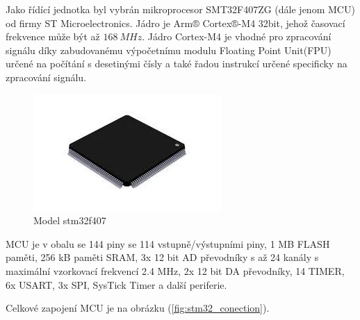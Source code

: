 Jako řídící jednotka byl vybrán mikroprocesor SMT32F407ZG (dále jenom MCU) od firmy ST Microelectronics.
Jádro je Arm® Cortex®-M4 32bit, jehož časovací frekvence může být až $168 \ MHz$. Jádro Cortex-M4 je vhodné pro zpracování signálu díky zabudovanému výpočetnímu modulu Floating Point Unit(FPU) určené na
počítání s desetinými čísly a také řadou instrukcí určené specificky na zpracování signálu.
\begin{figure}[H]
    \centering
    \includegraphics[width=0.5\linewidth]{pictures/stm32f407.jpg}
    \caption{Model stm32f407}
    \label{fig:stm32}
\end{figure}
MCU je v obalu se 144 piny se 114 vstupně/výstupními piny, 1 MB FLASH paměti, 256 kB paměti SRAM, 3x 12 bit AD převodníky s až 24 kanály s maximální vzorkovací frekvencí 2.4 MHz,
2x 12 bit DA převodníky, 14 TIMER, 6x USART, 3x SPI, SysTick Timer a další periferie.
\par
Celkové zapojení MCU je na obrázku (\ref{fig:stm32_conection}).


